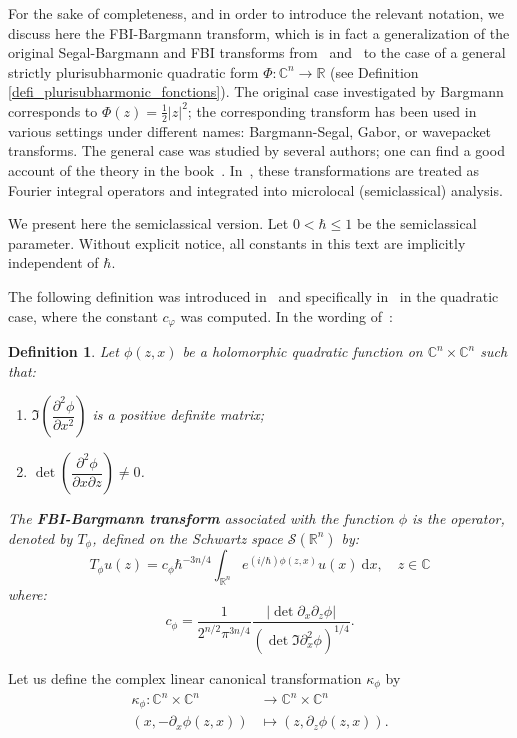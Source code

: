 \documentclass{article}
\newtheorem{defi}[theo]{Definition}
\newcommand{\abs}[1]{\left|#1\right|}
\newcommand{\DD}{\:\!\mathrm{d}}
\newcommand{\phy}{\varphi}
\newcommand{\RM}{\mathbb{R}}
\newcommand{\CM}{\mathbb{C}}
\newcommand{\h}{\hbar}
\begin{document}
For the sake of completeness, and in order to introduce the relevant
notation, we discuss here the FBI-Bargmann transform, which is in fact
a generalization of the original Segal-Bargmann and FBI transforms
from~\cite{bargmann} and~\cite{bros-iagolnitzer} to the case of a
general strictly plurisubharmonic quadratic form $\Phi : \CM^n\to \RM$
(see Definition \ref{defi_plurisubharmonic_fonctions}). The original
case investigated by Bargmann corresponds to
$\Phi(z)= \frac{1}{2} \abs{z}^2$; the corresponding transform has been
used in various settings under different names: Bargmann-Segal, Gabor,
or wavepacket transforms. The general case was studied by several
authors; one can find a good account of the theory in the
book~\cite[Chapter 13]{zworski-book-12}. In~\cite{sj-asterisque-82},
\cite{sj-96} these transformations are treated as Fourier integral
operators and integrated into microlocal (semiclassical) analysis.


We present here the semiclassical version.  Let $ 0 < \hbar \leq 1$ be
the semiclassical parameter.  Without explicit notice, all constants
in this text are implicitly independent of $\h$.


The following definition was introduced in~\cite{sj-asterisque-82} and
specifically in~\cite[(1.3)]{sj-96} in the quadratic case, where the
constant $c_\phy$ was computed.  In the wording
of~\cite{zworski-book-12}:
\begin{defi} \label{defi_FBI_transform} Let $ \phi(z, x)$ be a
  holomorphic quadratic function on $ \CM^n \times \CM^n$ such that:
  \begin{enumerate}[label=\roman*)]
  \item $ \Im \left( \dfrac{\partial^2 \phi}{\partial x^2} \right)$ is
    a positive definite matrix;
  \item
    $ \det \left( \dfrac{\partial^2 \phi}{\partial x \partial z}
    \right) \neq 0$.
  \end{enumerate}
  The \textbf{FBI-Bargmann transform} associated with the function
  $\phi$ is the operator, denoted by $T_{ \phi}$, defined on the
  Schwartz space $ \mathscr{S}( \mathbb{R}^n)$ by:
  \[
  T_{ \phi} u(z) = c_{ \phi} \hbar^{-3n/4} \int_{ \mathbb{R}^n}
  e^{(i/\hbar) \phi(z,x)} u(x)\DD x, \quad z\in\CM
  \]
  where:
  \begin{equation} \label{formule_constante_c_phi} c_{ \phi} =
    \dfrac{1}{2^{n/2} \pi^{3n/4}} \dfrac{| \det \partial_x \partial_z
      \phi|}{(\det \Im \partial^2_x \phi )^{1/4}}.
  \end{equation}
\end{defi}
Let us define the complex linear canonical transformation
$\kappa_\phi$ by
\begin{align}
  \kappa_{ \phi}: \CM^n \times \CM^n 
  & \longrightarrow \CM^n \times \CM^n \\
  (x, - \partial_x \phi(z, x)) & \longmapsto (z, \partial_z \phi(z, x)).
\end{align}
\end{document}
